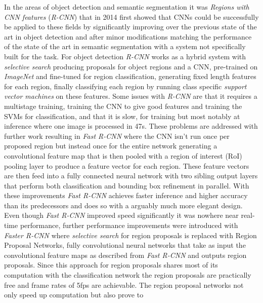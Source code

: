 \documentclass{kththesis}
\newcommand{\bibentry}[1]{\parencite{#1}}
\begin{document}
In the areas of object detection and semantic segmentation it was \emph{Regions
  with CNN features} (\emph{R-CNN}) \bibentry{girshick2014rich} that in 2014
first showed that CNNs could be successfully be applied to these fields by
significantly improving over the previous state of the art in object detection
\bibentry{ren2013histograms} and after minor modifications matching the
performance of the state of the art in semantic segmentation
\bibentry{carreira2012semantic} with a system not specifically built for the
task. For object detection \emph{R-CNN} works as a hybrid system with
\emph{selective search} \bibentry{uijlings2013selective} producing proposals for
object regions and a CNN, pre-trained on \emph{ImageNet}
\bibentry{deng2009imagenet} and fine-tuned for region classification, generating
fixed length features for each region, finally classifying each region by
running class specific \emph{support vector machines}
\bibentry{boser1992training} on these features. Some issues with \emph{R-CNN}
are that it requires a multistage training, training the CNN to give good
features and training the SVMs for classification, and that it is slow, for
training but most notably at inference where one image is processed in 47s.
These problems are addressed with further work resulting in \emph{Fast R-CNN}
\bibentry{girshick2015fast} where the CNN isn't run once per proposed region but
instead once for the entire network generating a convolutional feature map that
is then pooled with a region of interest (RoI) pooling layer to produce a
feature vector for each region. These feature vectors are then feed into a fully
connected neural network with two sibling output layers that perform both
classification and bounding box refinement in parallel. With these improvements
\emph{Fast R-CNN} achieves faster inference and higher accuracy than its
predecessors and does so with a arguably much more elegant design. Even though
\emph{Fast R-CNN} improved speed significantly it was nowhere near real-time
performance, further performance improvements were introduced with \emph{Faster
  R-CNN} \bibentry{ren2015faster} where \emph{selective search} for region
proposals is replaced with Region Proposal Networks, fully convolutional neural
networks that take as input the convolutional feature maps as described from
\emph{Fast R-CNN} and outputs region proposals. Since this approach for region
proposals shares most of its computation with the classification network the
region proposals are practically free and frame rates of 5fps are achievable.
The region proposal networks not only speed up computation but also prove to
\end{document}
